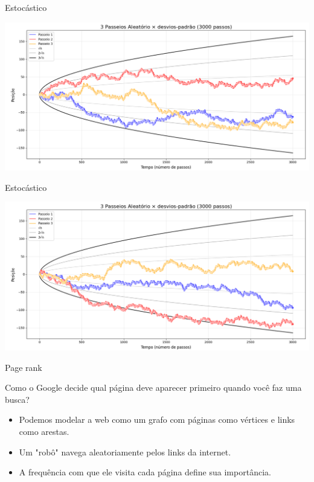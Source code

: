 \documentclass{beamer}
\begin{document}
\begin{frame}{Estocástico}

\includegraphics[width=\textwidth]{srw4.png}

\end{frame}

\begin{frame}{Estocástico}

\includegraphics[width=\textwidth]{srw5.png}

\end{frame}


\begin{frame}{Page rank}
\begin{block}{}
Como o Google decide qual página deve aparecer primeiro quando você faz uma busca?
\end{block}
\pause
\begin{itemize}
    \item Podemos modelar a web como um grafo com páginas como vértices e links como arestas.
    \item Um "robô" navega aleatoriamente pelos links da internet.
    \item A frequência com que ele visita cada página define sua importância.
\end{itemize}
\end{frame}
\end{document}
